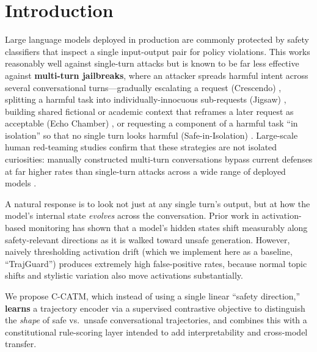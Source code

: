 \documentclass[11pt]{article}
\begin{document}
\section{Introduction}

Large language models deployed in production are commonly protected by safety classifiers that inspect a single input-output pair for policy violations. This works reasonably well against single-turn attacks but is known to be far less effective against \textbf{multi-turn jailbreaks}, where an attacker spreads harmful intent across several conversational turns---gradually escalating a request (Crescendo) \citep{russinovich2024crescendo}, splitting a harmful task into individually-innocuous sub-requests (Jigsaw) \citep{yang2024jigsaw}, building shared fictional or academic context that reframes a later request as acceptable (Echo Chamber) \citep{alobaid2026echochamber}, or requesting a component of a harmful task ``in isolation'' so that no single turn looks harmful (Safe-in-Isolation) \citep{srivastav2025safeinisolation}. Large-scale human red-teaming studies confirm that these strategies are not isolated curiosities: manually constructed multi-turn conversations bypass current defenses at far higher rates than single-turn attacks across a wide range of deployed models \citep{li2024mhj}.

A natural response is to look not just at any single turn's output, but at how the model's internal state \emph{evolves} across the conversation. Prior work in activation-based monitoring has shown that a model's hidden states shift measurably along safety-relevant directions as it is walked toward unsafe generation. However, naively thresholding activation drift (which we implement here as a baseline, ``TrajGuard'') produces extremely high false-positive rates, because normal topic shifts and stylistic variation also move activations substantially.

We propose C-CATM, which instead of using a single linear ``safety direction,'' \textbf{learns} a trajectory encoder via a supervised contrastive objective to distinguish the \emph{shape} of safe vs.\ unsafe conversational trajectories, and combines this with a constitutional rule-scoring layer intended to add interpretability and cross-model transfer.
\end{document}
